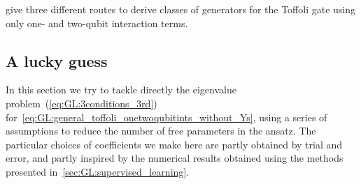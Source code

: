  give three different routes to derive classes of generators for the Toffoli gate using only one- and two-qubit interaction terms.

\subsection{A lucky guess}
\label{subsec:GL:lucky_guess}

In this section we try to tackle directly the eigenvalue problem~(\ref{eq:GL:3conditions_3rd}) for~\cref{eq:GL:general_toffoli_onetwoqubitints_without_Ys}, using a series of assumptions to reduce the number of free parameters in the ansatz. The particular choices of coefficients we make here are partly obtained by trial and error, and partly inspired by the numerical results obtained using the methods presented in~\cref{sec:GL:supervised_learning}.

